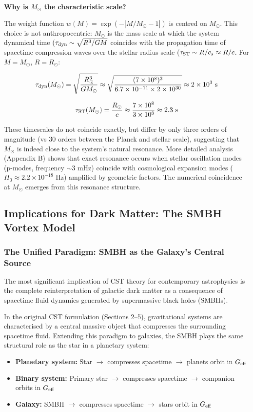 \documentclass[10pt,a4paper]{article}
\providecommand{\tightlist}{\setlength{\itemsep}{0pt}\setlength{\parskip}{0pt}}
\begin{document}
\textbf{Why is \(M_\odot\) the characteristic scale?}

The weight function \(w(M) = \exp(-|M/M_\odot - 1|)\) is centred on
\(M_\odot\). This choice is not anthropocentric: \(M_\odot\) is the mass
scale at which the system dynamical time
(\(\tau_{\rm dyn} \sim \sqrt{R^3/GM}\) coincides with the propagation
time of spacetime compression waves over the stellar radius scale
(\(\tau_{\rm ST} \sim R/c_s \approx R/c\). For \(M = M_\odot\),
\(R = R_\odot\):

\[\tau_{\rm dyn}(M_\odot) = \sqrt{\frac{R_\odot^3}{G M_\odot}} \approx \sqrt{\frac{(7\times10^8)^3}{6.7\times10^{-11} \times 2\times10^{30}}} \approx 2\times10^3~{\rm s}\]

\[\tau_{\rm ST}(M_\odot) = \frac{R_\odot}{c} \approx \frac{7\times10^8}{3\times10^8} \approx 2.3~{\rm s}\]

These timescales do not coincide exactly, but differ by only three
orders of magnitude (vs 30 orders between the Planck and stellar scale),
suggesting that \(M_\odot\) is indeed close to the system's natural
resonance. More detailed analysis (Appendix B) shows that exact
resonance occurs when stellar oscillation modes (p-modes, frequency
\(\sim 3\) mHz) coincide with cosmological expansion modes
(\(H_0 \approx 2.2\times10^{-18}\) Hz) amplified by geometric factors.
The numerical coincidence at \(M_\odot\) emerges from this resonance
structure.

\subsection{Implications for Dark Matter: The SMBH Vortex Model}\label{implications-for-dark-matter}

\subsubsection{The Unified Paradigm: SMBH as the Galaxy's Central Source}

The most significant implication of CST theory for contemporary astrophysics is the complete reinterpretation of galactic dark matter as a consequence of spacetime fluid dynamics generated by supermassive black holes (SMBHs).

In the original CST formulation (Sections 2--5), gravitational systems are characterised by a central massive object that compresses the surrounding spacetime fluid. Extending this paradigm to galaxies, the SMBH plays the same structural role as the star in a planetary system:
\begin{itemize}
\tightlist
\item \textbf{Planetary system:} Star $\to$ compresses spacetime $\to$ planets orbit in $G_{\rm eff}$
\item \textbf{Binary system:} Primary star $\to$ compresses spacetime $\to$ companion orbits in $G_{\rm eff}$
\item \textbf{Galaxy:} SMBH $\to$ compresses spacetime $\to$ stars orbit in $G_{\rm eff}$
\end{itemize}
\end{document}
